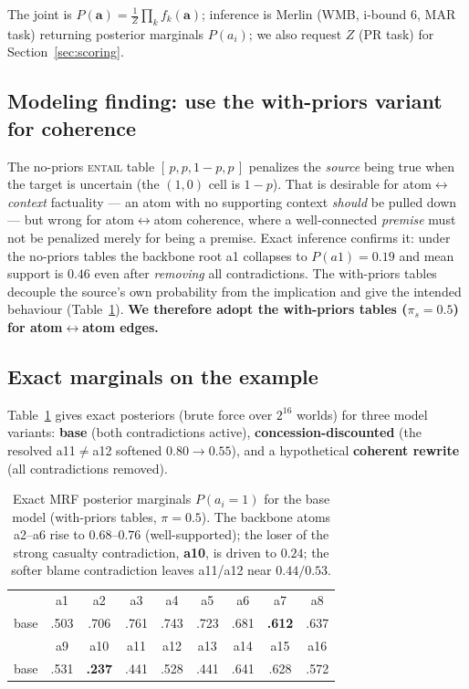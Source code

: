\documentclass[11pt]{article}
\begin{document}
The joint is $P(\mathbf a)=\tfrac1Z\prod_k f_k(\mathbf a)$; inference is Merlin (WMB,
i-bound 6, MAR task) returning posterior marginals $P(a_i)$; we also request $Z$ (PR task)
for Section~\ref{sec:scoring}.

\subsection*{Modeling finding: use the with-priors variant for coherence}
The no-priors \textsc{entail} table $[\,p,p,1{-}p,p\,]$ penalizes the \emph{source} being
true when the target is uncertain (the $(1,0)$ cell is $1{-}p$). That is desirable for
atom$\leftrightarrow$\emph{context} factuality --- an atom with no supporting context
\emph{should} be pulled down --- but wrong for atom$\leftrightarrow$atom coherence, where a
well-connected \emph{premise} must not be penalized merely for being a premise. Exact
inference confirms it: under the no-priors tables the backbone root a1 collapses to
$P(a1)=0.19$ and mean support is $0.46$ even after \emph{removing} all contradictions. The
with-priors tables decouple the source's own probability from the implication and give the
intended behaviour (Table~\ref{tab:marg}). \textbf{We therefore adopt the with-priors
tables ($\pi_s=0.5$) for atom$\leftrightarrow$atom edges.}

\subsection{Exact marginals on the example}
Table~\ref{tab:marg} gives exact posteriors (brute force over $2^{16}$ worlds) for three
model variants: \textbf{base} (both contradictions active), \textbf{concession-discounted}
(the resolved a11$\neq$a12 softened $0.80\!\to\!0.55$), and a hypothetical
\textbf{coherent rewrite} (all contradictions removed).

\begin{table}[h]\centering\small
\renewcommand{\arraystretch}{1.05}
\begin{tabular}{@{}l*{8}{c}@{}}
\toprule
 & a1 & a2 & a3 & a4 & a5 & a6 & a7 & a8\\
base & .503 & .706 & .761 & .743 & .723 & .681 & \textbf{.612} & .637\\
\midrule
 & a9 & a10 & a11 & a12 & a13 & a14 & a15 & a16\\
base & .531 & \textbf{.237} & .441 & .528 & .441 & .641 & .628 & .572\\
\bottomrule
\end{tabular}
\caption{Exact MRF posterior marginals $P(a_i{=}1)$ for the base model (with-priors
tables, $\pi{=}0.5$). The backbone atoms a2--a6 rise to $0.68$--$0.76$ (well-supported);
the loser of the strong casualty contradiction, \textbf{a10}, is driven to $0.24$; the
softer blame contradiction leaves a11/a12 near $0.44/0.53$.}
\label{tab:marg}
\end{table}
\end{document}
